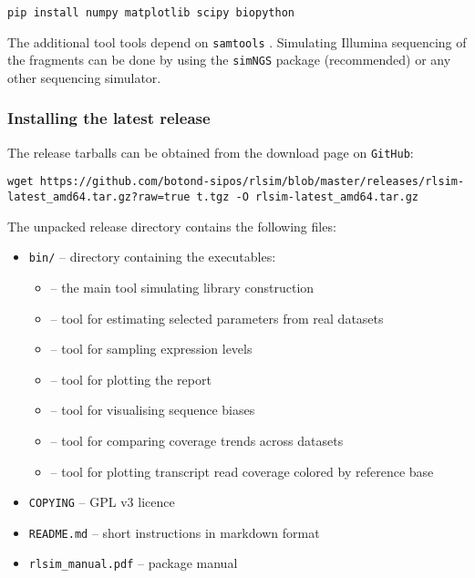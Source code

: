 \begin{verbatim}
pip install numpy matplotlib scipy biopython
\end{verbatim}

The additional tool \plotCov tools depend on {\tt samtools} \cite{samtools}.
Simulating Illumina sequencing of the fragments can be done by using the {\tt simNGS} package \cite{simngs} (recommended) or any other sequencing simulator.

\subsubsection{Installing the latest release}
\label{sss:release_inst}

The release tarballs can be obtained from the \rlsim download \cite{rlsim_down} page on \texttt{GitHub}:

\begin{verbatim}
wget https://github.com/botond-sipos/rlsim/blob/master/releases/rlsim-latest_amd64.tar.gz?raw=true t.tgz -O rlsim-latest_amd64.tar.gz
\end{verbatim}

The unpacked release directory contains the following files:

\begin{itemize}
    \item{{\tt bin/} -- directory containing the executables:
        \begin{itemize}
            \item[]{\rlsim -- the main tool simulating library construction}
            \item[]{\effest -- tool for estimating selected parameters from real datasets}
            \item[]{\sel -- tool for sampling expression levels}
            \item[]{\plotRlsim -- tool for plotting the \rlsim report}
            \item[]{\pbPlot -- tool for visualising sequence biases}
            \item[]{\covCmp -- tool for comparing coverage trends across datasets}
            \item[]{\plotCov -- tool for plotting transcript read coverage colored by reference base}
        \end{itemize}
    }
    \item {\tt COPYING} -- GPL v3 licence
    \item {\tt README.md} -- short instructions in markdown format
    \item {\tt rlsim\_manual.pdf} -- package manual
\end{itemize}


